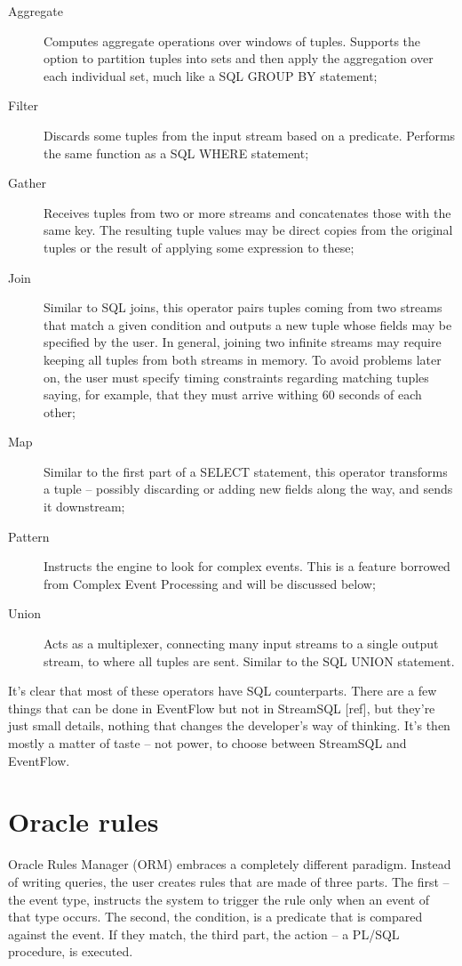 \documentclass{report}
\begin{document}
\begin{description}
\item [Aggregate] Computes aggregate operations over windows of
  tuples. Supports the option to partition tuples into sets and then
  apply the aggregation over each individual set, much like a SQL
  GROUP BY statement;
\item [Filter] Discards some tuples from the input stream based on a
  predicate. Performs the same function as a SQL WHERE statement;
\item [Gather] Receives tuples from two or more streams and
  concatenates those with the same key. The resulting tuple values may
  be direct copies from the original tuples or the result of applying
  some expression to these;
\item [Join] Similar to SQL joins, this operator pairs tuples coming
  from two streams that match a given condition and outputs a new
  tuple whose fields may be specified by the user. In general, joining
  two infinite streams may require keeping all tuples from both
  streams in memory. To avoid problems later on, the user must specify
  timing constraints regarding matching tuples saying, for example,
  that they must arrive withing 60 seconds of each other;
\item [Map] Similar to the first part of a SELECT statement, this
  operator transforms a tuple -- possibly discarding or adding new
  fields along the way, and sends it downstream;
\item [Pattern] Instructs the engine to look for complex events. This
  is a feature borrowed from Complex Event Processing and will be
  discussed below;
\item [Union] Acts as a multiplexer, connecting many input streams to
  a single output stream, to where all tuples are sent. Similar to the
  SQL UNION statement.
\end{description}

It's clear that most of these operators have SQL counterparts. There
are a few things that can be done in EventFlow but not in StreamSQL
[ref], but they're just small details, nothing that changes the
developer's way of thinking. It's then mostly a matter of taste -- not
power, to choose between StreamSQL and EventFlow.

\section{Oracle rules}

Oracle Rules Manager (ORM) embraces a completely different
paradigm. Instead of writing queries, the user creates rules that are
made of three parts. The first -- the event type, instructs the system
to trigger the rule only when an event of that type occurs. The
second, the condition, is a predicate that is compared against the
event. If they match, the third part, the action -- a PL/SQL
procedure, is executed.
\end{document}
